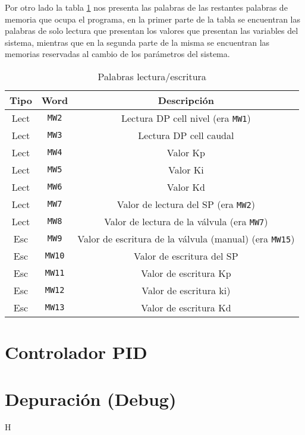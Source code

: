 Por otro lado la tabla \ref{table:palabraslecturasescrituras} nos presenta 
las palabras de las restantes palabras de memoria que ocupa el programa, en 
la primer parte de la tabla se encuentran las palabras de solo lectura que 
presentan los valores que presentan las variables del sistema, mientras que en la 
segunda parte de la misma se encuentran las memorias reservadas al cambio
de los parámetros del sistema.

\begin{table}[!t]

\renewcommand{\arraystretch}{1.3}
\centering
\begin{tabular}{c||c||c}
\hline
\bfseries Tipo & \bfseries Word  & \bfseries Descripción\\
\hline \hline
Lect & \verb|MW2|  & Lectura DP cell nivel (era \verb|MW1|)\\
Lect & \verb|MW3|  & Lectura DP cell caudal\\
Lect & \verb|MW4|  & Valor Kp\\
Lect & \verb|MW5|  & Valor Ki\\
Lect & \verb|MW6|  & Valor Kd\\
Lect & \verb|MW7|  & Valor de lectura del SP (era \verb|MW2|)\\
Lect & \verb|MW8|  & Valor de lectura de la válvula (era \verb|MW7|)\\
\hline
Esc & \verb|MW9| & Valor de escritura de la válvula (manual) (era 
\verb|MW15|) \\
Esc & \verb|MW10|  & Valor de escritura del SP \\
Esc & \verb|MW11|  & Valor de escritura Kp \\
Esc & \verb|MW12|  & Valor de escritura ki) \\
Esc & \verb|MW13| & Valor de escritura Kd \\
\hline
\end{tabular}
\caption{Palabras lectura/escritura}
\label{table:palabraslecturasescrituras}
\end{table}

\section{Controlador PID}
\label{sec:controladorpid}



\section{Depuración (Debug)}
\label{sec:Debug}

H
